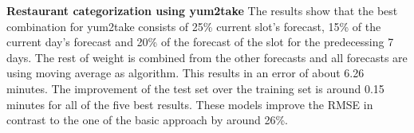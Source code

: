 \begin{table}[h]
\centering
\caption{Combination of categorizations results for all orders}
\label{Combination of Categorizations results for all orders}
\end{table}
\newline\newline\textbf{Restaurant categorization using yum2take}\newline
The results show that the best combination for yum2take consists of 25\% current slot's forecast, 15\% of the current day's forecast and 20\% of the forecast of the slot for the predecessing 7 days. The rest of weight is combined from the other forecasts and all forecasts are using moving average as algorithm. This results in an error of about 6.26 minutes. The improvement of the test set over the training set is around 0.15 minutes for all of the five best results.\newline
These models improve the RMSE in contrast to the one of the basic approach by around 26\%.
